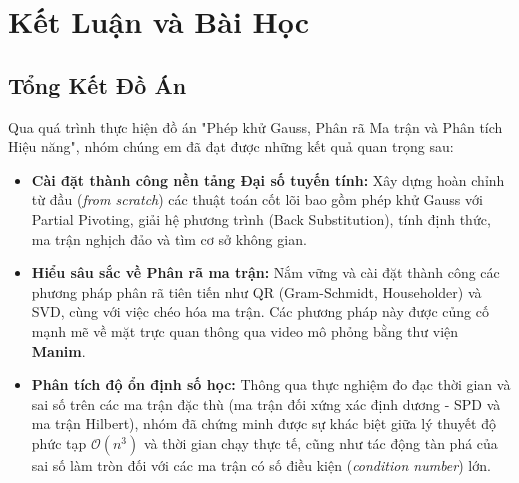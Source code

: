 \section{Kết Luận và Bài Học}

\subsection{Tổng Kết Đồ Án}
Qua quá trình thực hiện đồ án "Phép khử Gauss, Phân rã Ma trận và Phân tích Hiệu năng", nhóm chúng em đã đạt được những kết quả quan trọng sau:
\begin{itemize}
    \item \textbf{Cài đặt thành công nền tảng Đại số tuyến tính:} Xây dựng hoàn chỉnh từ đầu (\textit{from scratch}) các thuật toán cốt lõi bao gồm phép khử Gauss với Partial Pivoting, giải hệ phương trình (Back Substitution), tính định thức, ma trận nghịch đảo và tìm cơ sở không gian.
    \item \textbf{Hiểu sâu sắc về Phân rã ma trận:} Nắm vững và cài đặt thành công các phương pháp phân rã tiên tiến như QR (Gram-Schmidt, Householder) và SVD, cùng với việc chéo hóa ma trận. Các phương pháp này được củng cố mạnh mẽ về mặt trực quan thông qua video mô phỏng bằng thư viện \textbf{Manim}.
    \item \textbf{Phân tích độ ổn định số học:} Thông qua thực nghiệm đo đạc thời gian và sai số trên các ma trận đặc thù (ma trận đối xứng xác định dương - SPD và ma trận Hilbert), nhóm đã chứng minh được sự khác biệt giữa lý thuyết độ phức tạp $\mathcal{O}(n^3)$ và thời gian chạy thực tế, cũng như tác động tàn phá của sai số làm tròn đối với các ma trận có số điều kiện (\textit{condition number}) lớn.
\end{itemize}

